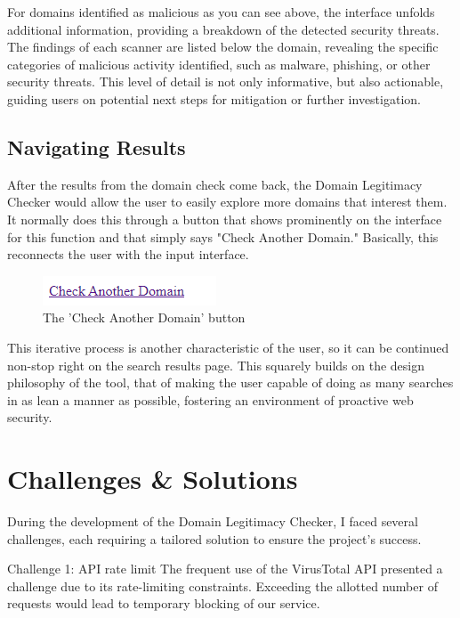 For domains identified as malicious as you can see above, the interface unfolds additional information, providing a breakdown of the detected security threats. The findings of each scanner are listed below the domain, revealing the specific categories of malicious activity identified, such as malware, phishing, or other security threats. This level of detail is not only informative, but also actionable, guiding users on potential next steps for mitigation or further investigation.

\subsection{Navigating Results}

After the results from the domain check come back, the Domain Legitimacy Checker would allow the user to easily explore more domains that interest them. It normally does this through a button that shows prominently on the interface for this function and that simply says "Check Another Domain." Basically, this reconnects the user with the input interface.

\begin{figure}[H]
    \centering
    \includegraphics[width=0.3\linewidth]{project/ii.png}
    \caption{The 'Check Another Domain' button}
    \label{fig:enter-label}
\end{figure}

This iterative process is another characteristic of the user, so it can be continued non-stop right on the search results page. This squarely builds on the design philosophy of the tool, that of making the user capable of doing as many searches in as lean a manner as possible, fostering an environment of proactive web security.




\section{Challenges \& Solutions}

During the development of the Domain Legitimacy Checker, I faced several challenges, each requiring a tailored solution to ensure the project's success.

Challenge 1: API rate limit
The frequent use of the VirusTotal API presented a challenge due to its rate-limiting constraints. Exceeding the allotted number of requests would lead to temporary blocking of our service.

